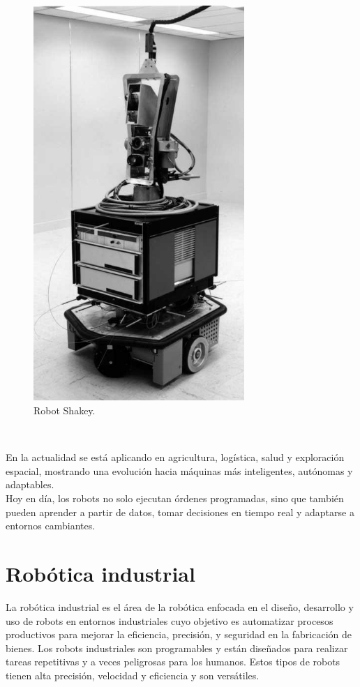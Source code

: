 \begin{figure} [h!]
  \begin{center}
    \includegraphics[width=8cm]{figs/shakey}
  \end{center}
  \caption{Robot Shakey.}
  \label{fig:shakey}
\end{figure}\

En la actualidad se está aplicando en agricultura, logística, salud y exploración espacial, mostrando una evolución hacia máquinas más inteligentes, autónomas y adaptables.\\


Hoy en día, los robots no solo ejecutan órdenes programadas, sino que también pueden aprender a partir de datos, tomar decisiones en tiempo real y adaptarse a entornos cambiantes. 


\section{Robótica industrial}
\label{sec:segundaseccion}

La robótica industrial es el área de la robótica enfocada en el diseño, desarrollo y uso de robots en entornos industriales cuyo objetivo es automatizar procesos productivos para mejorar la eficiencia, precisión, y seguridad en la fabricación de bienes. Los robots industriales son programables y están diseñados para realizar tareas repetitivas y a veces peligrosas para los humanos. Estos tipos de robots tienen alta precisión, velocidad y eficiencia y son versátiles. \\ \\ \\

